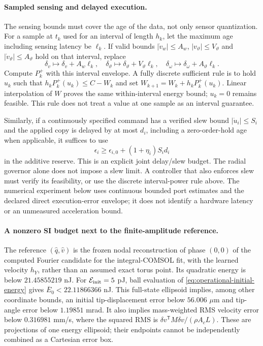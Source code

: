 \paragraph{Sampled sensing and delayed execution.}
The sensing bounds must cover the age of the data, not only sensor
quantization. For a sample at $t_k$ used for an interval of length $h_k$,
let the maximum age including sensing latency be $\ell_k$.
If valid bounds $|\dot v_w|\leq A_w$,
$|v_\vartheta|\leq V_\vartheta$ and
$|\dot v_\vartheta|\leq A_\vartheta$ hold on that interval, replace
\begin{equation}
 \delta_v\mapsto\delta_v+A_w\ell_k,\quad
 \delta_\vartheta\mapsto\delta_\vartheta+V_\vartheta\ell_k,\quad
 \delta_\omega\mapsto\delta_\omega+A_\vartheta\ell_k.
 \label{eq:operational-sensor-age}
\end{equation}
Compute $P_k^+$ with this interval envelope. A fully discrete sufficient
rule is to hold $u_k$ such that
$h_kP_k^+(u_k)\leq C-W_k$ and set
$W_{k+1}=W_k+h_kP_k^+(u_k)$. Linear interpolation of $W$ proves the same
within-interval energy bound; $u_k=0$ remains feasible. This rule does
not treat a value at one sample as an interval guarantee.

Similarly, if a continuously specified command has a verified slew bound
$|\dot u_i|\leq S_i$ and the applied copy is delayed by at most $d_i$,
including a zero-order-hold age when applicable, it suffices to use
\begin{equation}
 \epsilon_i\geq\epsilon_{i,0}+(1+\eta_i)S_id_i
 \label{eq:operational-execution-age}
\end{equation}
in the additive reserve. This is an explicit joint delay/slew budget.
The radial governor alone does not impose a slew limit. A controller
that also enforces slew must verify its feasibility, or use the discrete
interval-power rule above. The numerical experiment below uses continuous
bounded port estimates and the declared direct execution-error envelope;
it does not identify a hardware latency or an unmeasured acceleration bound.

\paragraph{A nonzero SI budget next to the finite-amplitude reference.}
The reference $(\widehat q,\widehat v)$ is the frozen nodal reconstruction
of phase $(0,0)$ of the computed Fourier candidate for the integral-COMSOL
fit, with the learned velocity $h_Y$, rather than an assumed exact torus
point. Its quadratic energy is below $21.45855219$ nJ.
For $\mathcal E_{\rm init}=5$ pJ, ball evaluation of
\eqref{eq:operational-initial-energy} gives
$\overline E_0<22.11866366$ nJ. This full-state ellipsoid implies, among
other coordinate bounds, an initial tip-displacement error below
$56.006$ $\mu$m and tip-angle error below $1.19851$ mrad.
It also implies mass-weighted RMS velocity error below $0.316981$ mm/s,
where the squared RMS is $\delta v^{\mathsf T}M\delta v/(\rho A_cL)$.
These are projections of one energy ellipsoid; their endpoints cannot
be independently combined as a Cartesian error box.

